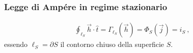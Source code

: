 \documentclass[letterpaper,10pt,italian]{jupyterBook}
\begin{document}
\subsubsection{Legge di Ampére in regime stazionario}
\label{\detokenize{ch/electromagnetism/electromagnetism-steady:legge-di-ampere-in-regime-stazionario}}\label{\detokenize{ch/electromagnetism/electromagnetism-steady:physics-hs-electromagnetism-electromagnetism-steady-maxwell-ampere}}\begin{equation}\label{equation:ch/electromagnetism/electromagnetism-steady:eq:ampere:steady}
\begin{split}\oint_{\ell_S} \vec{h} \cdot \hat{t} = \Gamma_{\ell_S}(\vec{h}) = \Phi_{S}(\vec{j}) = i_S \ ,\end{split}
\end{equation}
\sphinxAtStartPar
essendo \(\ell_S = \partial S\) il contorno \sphinxhyphen{} chiuso \sphinxhyphen{} della superficie \(S\).
\end{document}
